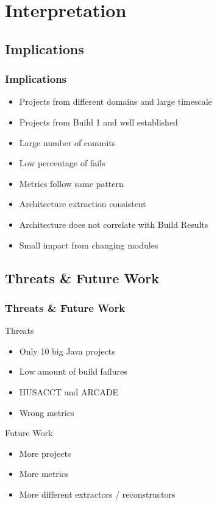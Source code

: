 \documentclass{beamer}
\begin{document}
\section{Interpretation}
\subsection{Implications}
\begin{frame}
\frametitle{Implications}

\begin{itemize}
	\item Projects from different domains and large timescale
	\item Projects from Build 1 and well established
	\item Large number of commits
	\item Low percentage of fails
\end{itemize}
\pause
\begin{itemize}
	\item Metrics follow same pattern
	\item Architecture extraction consistent
\end{itemize}
\pause
\begin{itemize}	
	\item Architecture does not correlate with Build Results
	\item Small impact from changing modules
\end{itemize}

\end{frame}

\subsection{Threats \& Future Work}
\begin{frame}
\frametitle{Threats \& Future Work}

Threats
\begin{itemize}
	\item Only 10 big Java projects
	\item Low amount of build failures
	\item HUSACCT and ARCADE
	\item Wrong metrics
\end{itemize}
\vspace{0.25cm}
\pause

Future Work
\begin{itemize}
	\item More projects
	\item More metrics
	\item More different extractors / reconstructors
\end{itemize}

\end{frame}
\end{document}
